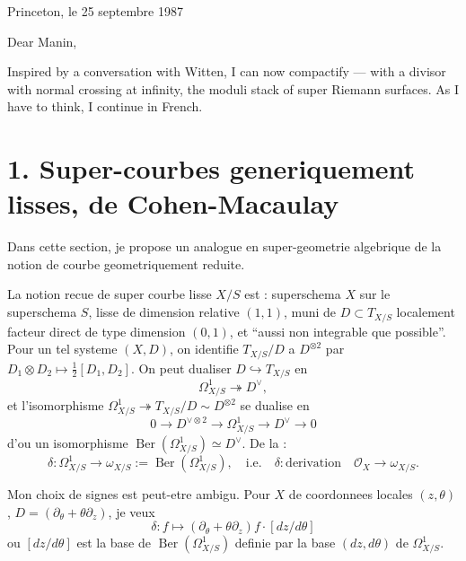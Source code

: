\documentclass[11pt,a4paper]{article}
\theoremstyle{plain}
\theoremstyle{definition}
\DeclareMathOperator{\Ber}{Ber}
\begin{document}
\begin{flushright}
Princeton, le 25 septembre 1987
\end{flushright}

\vspace{0.5cm}

\noindent Dear Manin,

\vspace{0.3cm}

Inspired by a conversation with Witten, I can now compactify --- with a divisor with normal crossing at infinity, the moduli stack of super Riemann surfaces. As I have to think, I continue in French.

\vspace{0.5cm}

\section*{1. Super-courbes generiquement lisses, de Cohen-Macaulay}

Dans cette section, je propose un analogue en super-geometrie algebrique de la notion de courbe geometriquement reduite.

La notion recue de super courbe lisse $X/S$ est : superschema $X$ sur le superschema $S$, lisse de dimension relative $(1,1)$, muni de $D \subset T_{X/S}$ localement facteur direct de type dimension $(0,1)$, et ``aussi non integrable que possible''. Pour un tel systeme $(X,D)$, on identifie $T_{X/S}/D$ a $D^{\otimes 2}$ par $D_1 \otimes D_2 \mapsto \frac{1}{2}[D_1,D_2]$. On peut dualiser $D \hookrightarrow T_{X/S}$ en
\[
\Omega^1_{X/S} \twoheadrightarrow D^{\vee},
\]
et l'isomorphisme $\Omega^1_{X/S} \twoheadrightarrow T_{X/S}/D \sim D^{\otimes 2}$ se dualise en
\[
0 \longrightarrow D^{\vee \otimes 2} \longrightarrow \Omega^1_{X/S} \longrightarrow D^{\vee} \longrightarrow 0
\]
d'ou un isomorphisme $\Ber(\Omega^1_{X/S}) \simeq D^{\vee}$. De la :
\begin{equation}\label{eq1.2}
\delta : \Omega^1_{X/S} \longrightarrow \omega_{X/S} := \Ber(\Omega^1_{X/S}), \quad \text{i.e.} \quad \delta : \text{derivation} \quad \mathcal{O}_X \longrightarrow \omega_{X/S}.
\end{equation}

Mon choix de signes est peut-etre ambigu. Pour $X$ de coordonnees locales $(z,\theta)$, $D = (\partial_\theta + \theta\partial_z)$, je veux
\[
\delta : f \longmapsto (\partial_\theta + \theta\partial_z)f \cdot [dz/d\theta]
\]
ou $[dz/d\theta]$ est la base de $\Ber(\Omega^1_{X/S})$ definie par la base $(dz,d\theta)$ de $\Omega^1_{X/S}$.
\end{document}
